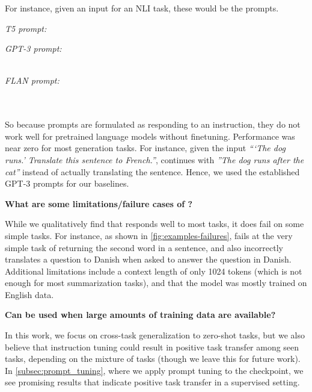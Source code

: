 For instance, given an input for an NLI task, these would be the prompts.

\textit{T5 prompt:} \\

\textit{GPT-3 prompt:} \\
 \\

\textit{FLAN prompt:} \\
\\
\\

So because \flan{} prompts are formulated as responding to an instruction, they do not work well for pretrained language models without finetuning. 
Performance was near zero for most generation tasks. 
For instance, given the input \textit{```The dog runs.' Translate this sentence to French.''}, \baselm{} continues with \textit{''The dog runs after the cat''} instead of actually translating the sentence. Hence, we used the established GPT-3 prompts for our \baselm{} baselines.

\vspace{4mm}
\textbf{What are some limitations/failure cases of \flan{}?}

While we qualitatively find that \flan{} responds well to most tasks, it does fail on some simple tasks. 
For instance, as shown in \cref{fig:examples-failures}, \flan{} fails at the very simple task of returning the second word in a sentence, and also incorrectly translates a question to Danish when asked to answer the question in Danish.
Additional limitations include a context length of only 1024 tokens (which is not enough for most summarization tasks), and that the model was mostly trained on English data.

\vspace{4mm}
\textbf{Can \flan{} be used when large amounts of training data are available?}

In this work, we focus on cross-task generalization to zero-shot tasks, but we also believe that instruction tuning could result in positive task transfer among seen tasks, depending on the mixture of tasks (though we leave this for future work). 
In \cref{subsec:prompt_tuning}, where we apply prompt tuning to the \flan{} checkpoint, we see promising results that indicate positive task transfer in a supervised setting.

